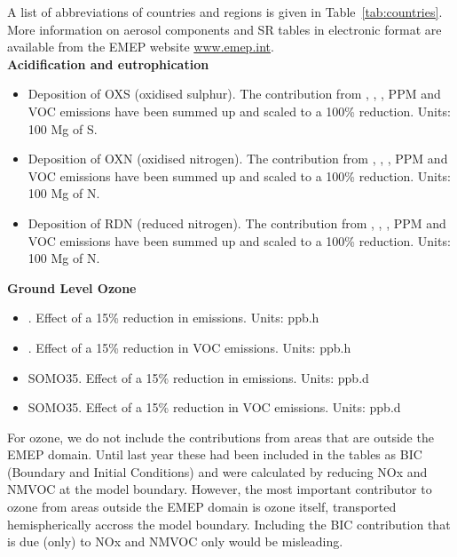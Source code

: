 A list of abbreviations of countries and regions is given in Table~\ref{tab:countries}.\\

More information on aerosol components and SR tables in 
electronic format are available from the EMEP website \url{www.emep.int}.\\


\textbf{Acidification and eutrophication}
\begin{itemize}
\item Deposition of OXS (oxidised sulphur). The contribution from \sox,
  \nox, \nhiii, PPM and VOC emissions have been summed up and scaled to a
  100\% reduction. Units: 100 Mg of S.
\item Deposition of OXN (oxidised nitrogen). The contribution from \sox,
  \nox, \nhiii, PPM and VOC emissions have been summed up and scaled to a
  100\% reduction. Units: 100 Mg of N.
\item Deposition of RDN (reduced nitrogen). The contribution from \sox,
  \nox, \nhiii, PPM and VOC emissions have been summed up and scaled to a
  100\% reduction. Units: 100 Mg of N.
\end{itemize}
\vspace{20pt}

\textbf{Ground Level Ozone}
\begin{itemize}
\item \aotucf. Effect of a 15\% reduction in \nox emissions. Units: ppb.h
\item \aotucf. Effect of a 15\% reduction in VOC emissions. Units: ppb.h 
\item SOMO35. Effect of a 15\% reduction in \nox emissions. Units: ppb.d 
\item SOMO35. Effect of a 15\% reduction in VOC emissions. Units: ppb.d 
\end{itemize}
For ozone, we do not include the contributions from areas that are outside the EMEP domain. Until last year these had been included in the tables as BIC (Boundary and Initial Conditions) and were calculated by reducing NOx and NMVOC at the model boundary. However, the most important contributor to ozone from areas outside the EMEP domain is ozone itself, transported hemispherically accross the model boundary. Including the BIC contribution that is due (only) to NOx and NMVOC only would be misleading.
\vspace{20pt}


